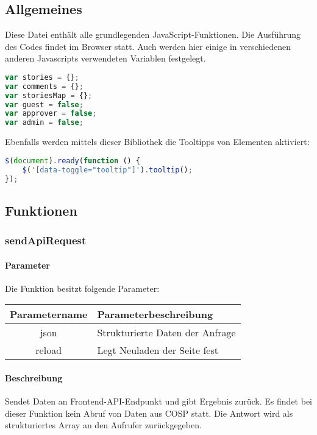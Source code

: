 \subsection{Allgemeines} Diese Datei enthält alle grundlegenden JavaScript-Funktionen.
Die Ausführung des Codes findet im Browser statt. Auch werden hier einige in verschiedenen anderen Javascripts verwendeten Variablen festgelegt.
\begin{lstlisting}[language=JavaScript]
var stories = {};
var comments = {};
var storiesMap = {};
var guest = false;
var approver = false;
var admin = false;
\end{lstlisting}
Ebenfalls werden mittels dieser Bibliothek die Tooltipps von Elementen aktiviert:
\begin{lstlisting}[language=JavaScript]
$(document).ready(function () {
	$('[data-toggle="tooltip"]').tooltip();
});
\end{lstlisting}
\newpage
\subsection{Funktionen}
\subsubsection{sendApiRequest}
\paragraph{Parameter} Die Funktion besitzt folgende Parameter:
\begin{table}[H]
	\begin{tabular}{|c|p{11cm}|}
		\hline
		\textbf{Parametername} & \textbf{Parameterbeschreibung} \\ \hline
		json   & Strukturierte Daten der Anfrage \\ \hline
		reload & Legt Neuladen der Seite fest \\ \hline
	\end{tabular}
\end{table}
\paragraph{Beschreibung} Sendet Daten an Frontend-API-Endpunkt und gibt Ergebnis zurück. Es findet bei dieser Funktion kein Abruf von Daten aus {\glqq COSP\grqq} statt. Die Antwort wird als strukturiertes Array an den Aufrufer zurückgegeben.

